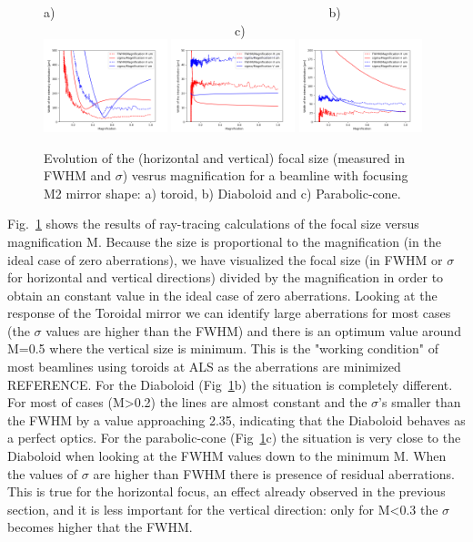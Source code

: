 \documentclass[a4paper, 11pt]{article}
\newcommand{\inred}[1]{{\color{red}#1}}
\begin{document}
\begin{figure}[h]
\flushleft
a)~~~~~~~~~~~~~~~~~~~~~~~~~~~~~~~~~~~~~~~~~~~b)~~~~~~~~~~~~~~~~~~~~~~~~~~~~~~~~~~~~~~~~~~~c)\\
\centering
\includegraphics[width=0.32\textwidth]{figures/scan_toroid.png}
\includegraphics[width=0.32\textwidth]{figures/scan_diaboloid.png}
\includegraphics[width=0.32\textwidth]{figures/scan_parabolic-cone.png}

\caption{\label{fig:scan}
Evolution of the (horizontal and vertical) focal size (measured in FWHM and $\sigma$) vesrus magnification for a beamline with focusing M2 mirror shape: a) toroid, b) Diaboloid and c) Parabolic-cone. 
}
\end{figure}


Fig.~\ref{fig:scan} shows the results of ray-tracing calculations of the focal size versus magnification M. Because the size is proportional to the magnification (in the ideal case of zero aberrations), we have visualized the focal size (in FWHM or $\sigma$ for horizontal and vertical directions) divided by the magnification in order to obtain an constant value in the ideal case of zero aberrations. Looking at the response of the Toroidal mirror we can identify large aberrations for most cases (the $\sigma$ values are higher than the FWHM) and there is an optimum value around M=0.5 where the vertical size is minimum. This is the "working condition" of most beamlines using toroids at ALS as the aberrations are minimized \inred{REFERENCE}. For the Diaboloid (Fig~\ref{fig:scan}b) the situation is completely different. For most of cases (M>0.2) the lines are almost constant and the $\sigma$'s smaller than the FWHM by a value approaching 2.35, indicating that the Diaboloid behaves as a perfect optics. For the parabolic-cone (Fig~\ref{fig:scan}c) the situation is very close to the Diaboloid when looking at the FWHM values down to the minimum M. When the values of $\sigma$ are higher than FWHM there is presence of residual aberrations. This is true for the horizontal focus, an effect already observed in the previous section, and it is less important for the vertical direction: only for M<0.3 the $\sigma$ becomes higher that the FWHM.  
\end{document}
